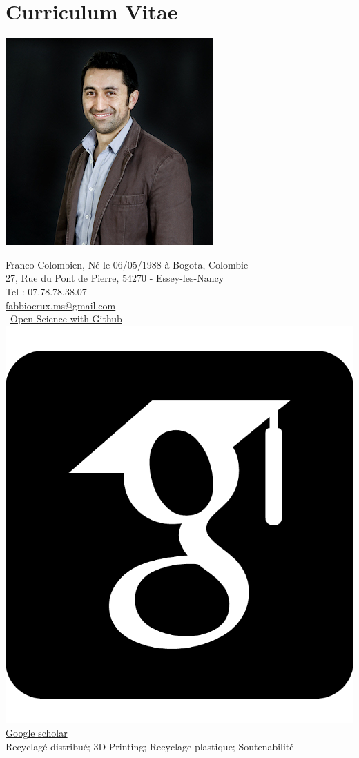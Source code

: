 \documentclass[
  12pt,
  oneside]{book}
\begin{document}
{
\hypersetup{linkcolor=}
\setcounter{tocdepth}{1}
\tableofcontents
}
\hypertarget{curriculum-vitae}{%
\chapter{Curriculum Vitae}\label{curriculum-vitae}}

\begin{minipage}{0.35\linewidth}

\begin{center}\includegraphics[width=0.6\linewidth]{Figures/Fabio} \end{center}
\end{minipage}
\begin{minipage}{0.60\linewidth}

Franco-Colombien, Né le 06/05/1988 à Bogota, Colombie  \\
27, Rue du Pont de Pierre, 54270 - Essey-les-Nancy \\
Tel : 07.78.78.38.07 \\


\faEnvelope[regular] \href{mailto:fabbiocrux.ms@gmail.com}{fabbiocrux.ms@gmail.com} \\
\faGithub~\href{https://github.com/fabbiocrux}{Open Science with Github} \\
\includegraphics[width=1.5ex]{Figures/icons/google-scholar-square.pdf}  \href{https://scholar.google.fr/citations?user=8Cuoaf4AAAAJ&hl=fr}{Google scholar} \\


Recyclagé distribué; 3D Printing; Recyclage plastique; Soutenabilité
 
\end{minipage}
\end{document}
